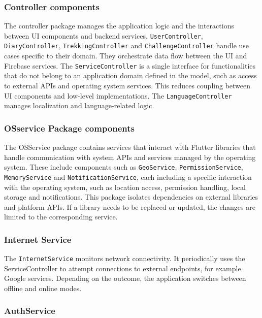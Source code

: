 \subsubsection{Controller components}
The controller package manages the application logic and the interactions between UI components and backend services. 
 \texttt{UserController}, \texttt{DiaryController}, \texttt{TrekkingController} and \texttt{ChallengeController} handle use cases specific to their domain. They orchestrate data flow between the UI and Firebase services.
The \texttt{ServiceController} is a single interface for functionalities that do not belong to an application domain defined in the model, such as access to external APIs and operating system services. This reduces coupling between UI components and low-level implementations.
The \texttt{LanguageController} manages localization and language-related logic.

\subsubsection{OSservice Package components}
The OSService package contains services that interact with Flutter libraries that handle communication with system APIs and services managed by the operating system.
These include components such as \texttt{GeoService}, \texttt{PermissionService}, \texttt{MemoryService} and \texttt{NotificationService}, each including a specific interaction with the operating system, such as location access, permission handling, local storage and notifications.
This package isolates dependencies on external libraries and platform APIs. If a library needs to be replaced or updated, the changes are limited to the corresponding service. 

\subsubsection{Internet Service}
The \texttt{InternetService} monitors network connectivity. It periodically uses the ServiceController to attempt connections to external endpoints, for example Google services. Depending on the outcome, the application switches between offline and online modes.





\subsubsection{AuthService}

